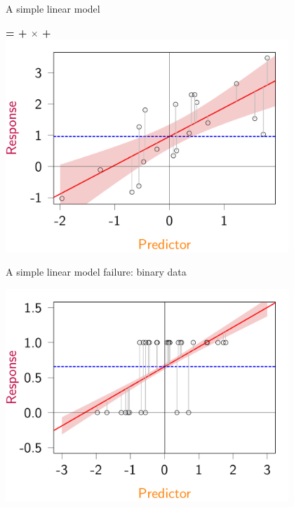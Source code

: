 \documentclass{beamer}\usepackage[]{graphicx}\usepackage[]{color}
\newenvironment{knitrout}{}{} %
\begin{document}
\begin{frame}[fragile]{A simple linear model}
\centering

  \textbf{{\color{purple}{Response}} = {\color{blue}{Intercept}} + {\color{red}{Slope}} $\times$ {\color{orange}{Predictor}} + {\color{gray}{Error}}} \\

\begin{knitrout}\small
{}\color{fgcolor}
\includegraphics[width=0.8\textwidth,height=0.6\textwidth]{figure/lmprinc-1} 

\end{knitrout}
\end{frame}

\begin{frame}[fragile]{A simple linear model failure: binary data}
\centering

\begin{knitrout}\small
{}\color{fgcolor}
\includegraphics[width=0.8\textwidth,height=0.6\textwidth]{figure/binlmprinc-1} 

\end{knitrout}
  
\end{frame}
\end{document}

